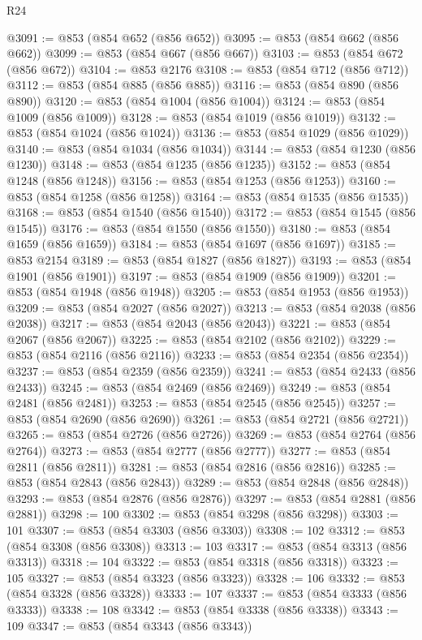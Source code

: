 \begin{lexlean}{R24}
\begin{coremodule}
@3091 := @853 (@854 @652 (@856 @652))
@3095 := @853 (@854 @662 (@856 @662))
@3099 := @853 (@854 @667 (@856 @667))
@3103 := @853 (@854 @672 (@856 @672))
@3104 := @853 @2176
@3108 := @853 (@854 @712 (@856 @712))
@3112 := @853 (@854 @885 (@856 @885))
@3116 := @853 (@854 @890 (@856 @890))
@3120 := @853 (@854 @1004 (@856 @1004))
@3124 := @853 (@854 @1009 (@856 @1009))
@3128 := @853 (@854 @1019 (@856 @1019))
@3132 := @853 (@854 @1024 (@856 @1024))
@3136 := @853 (@854 @1029 (@856 @1029))
@3140 := @853 (@854 @1034 (@856 @1034))
@3144 := @853 (@854 @1230 (@856 @1230))
@3148 := @853 (@854 @1235 (@856 @1235))
@3152 := @853 (@854 @1248 (@856 @1248))
@3156 := @853 (@854 @1253 (@856 @1253))
@3160 := @853 (@854 @1258 (@856 @1258))
@3164 := @853 (@854 @1535 (@856 @1535))
@3168 := @853 (@854 @1540 (@856 @1540))
@3172 := @853 (@854 @1545 (@856 @1545))
@3176 := @853 (@854 @1550 (@856 @1550))
@3180 := @853 (@854 @1659 (@856 @1659))
@3184 := @853 (@854 @1697 (@856 @1697))
@3185 := @853 @2154
@3189 := @853 (@854 @1827 (@856 @1827))
@3193 := @853 (@854 @1901 (@856 @1901))
@3197 := @853 (@854 @1909 (@856 @1909))
@3201 := @853 (@854 @1948 (@856 @1948))
@3205 := @853 (@854 @1953 (@856 @1953))
@3209 := @853 (@854 @2027 (@856 @2027))
@3213 := @853 (@854 @2038 (@856 @2038))
@3217 := @853 (@854 @2043 (@856 @2043))
@3221 := @853 (@854 @2067 (@856 @2067))
@3225 := @853 (@854 @2102 (@856 @2102))
@3229 := @853 (@854 @2116 (@856 @2116))
@3233 := @853 (@854 @2354 (@856 @2354))
@3237 := @853 (@854 @2359 (@856 @2359))
@3241 := @853 (@854 @2433 (@856 @2433))
@3245 := @853 (@854 @2469 (@856 @2469))
@3249 := @853 (@854 @2481 (@856 @2481))
@3253 := @853 (@854 @2545 (@856 @2545))
@3257 := @853 (@854 @2690 (@856 @2690))
@3261 := @853 (@854 @2721 (@856 @2721))
@3265 := @853 (@854 @2726 (@856 @2726))
@3269 := @853 (@854 @2764 (@856 @2764))
@3273 := @853 (@854 @2777 (@856 @2777))
@3277 := @853 (@854 @2811 (@856 @2811))
@3281 := @853 (@854 @2816 (@856 @2816))
@3285 := @853 (@854 @2843 (@856 @2843))
@3289 := @853 (@854 @2848 (@856 @2848))
@3293 := @853 (@854 @2876 (@856 @2876))
@3297 := @853 (@854 @2881 (@856 @2881))
@3298 := 100
@3302 := @853 (@854 @3298 (@856 @3298))
@3303 := 101
@3307 := @853 (@854 @3303 (@856 @3303))
@3308 := 102
@3312 := @853 (@854 @3308 (@856 @3308))
@3313 := 103
@3317 := @853 (@854 @3313 (@856 @3313))
@3318 := 104
@3322 := @853 (@854 @3318 (@856 @3318))
@3323 := 105
@3327 := @853 (@854 @3323 (@856 @3323))
@3328 := 106
@3332 := @853 (@854 @3328 (@856 @3328))
@3333 := 107
@3337 := @853 (@854 @3333 (@856 @3333))
@3338 := 108
@3342 := @853 (@854 @3338 (@856 @3338))
@3343 := 109
@3347 := @853 (@854 @3343 (@856 @3343))

\end{coremodule}
\end{lexlean}
